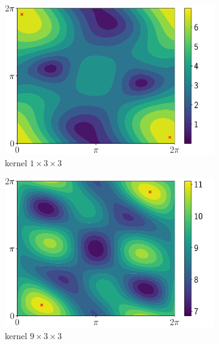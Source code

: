 \begin{figure}[htb]
  \centering
  \begin{subfigure}[b]{.49\textwidth}
    \centering
    \includegraphics[scale=0.35]{figures/main/ch5-lipschitz_regularization/contour_poly_200_1_1_3.pdf}
    \caption{kernel $1\times3\times3$}
  \end{subfigure}
  \hfill
  \begin{subfigure}[b]{.49\textwidth}
    \centering
    \includegraphics[scale=0.35]{figures/main/ch5-lipschitz_regularization/contour_poly_200_1_9_3.pdf}
    \caption{kernel $9\times3\times3$}
  \end{subfigure}
  \par\bigskip
  \begin{subfigure}[b]{.49\textwidth}
    \centering

\end{subfigure}
\end{figure}
